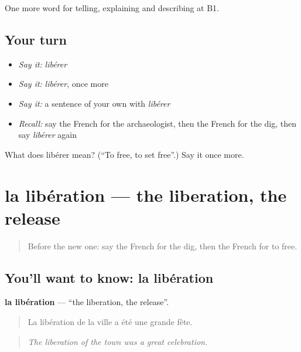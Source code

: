 \begin{grammarlens}[title={What you've built}]
One more word for telling, explaining and describing at B1.
\end{grammarlens}

\subsection*{Your turn}
\begin{itemize}
\raggedright
  \item \emph{Say it:} \emph{libérer}
  \item \emph{Say it:} \emph{libérer}, once more
  \item \emph{Say it:} a sentence of your own with \emph{libérer}
  \item \emph{Recall:} say the French for the archaeologist, then the French for the dig, then say \emph{libérer} again
\end{itemize}

\begin{tcolorbox}[breakable,colback=teal!4,colframe=teal!35!black,title={Before you move on}]
What does libérer mean? (\textquotedblleft{}To free, to set free\textquotedblright{}.) Say it once more.
\end{tcolorbox}
\section[la libération]{la libération — the liberation, the release}

\label{lesson:FR-C326-liberation}



\begin{quote}
Before the new one: say the French for the dig, then the French for to free.
\end{quote}

\subsection*{You'll want to know: la libération}
\textbf{la libération} — \textquotedblleft{}the liberation, the release\textquotedblright{}.

\begin{quote}
La libération de la ville a été une grande fête.
\end{quote}

\begin{quote}
\emph{The liberation of the town was a great celebration.}
\end{quote}


